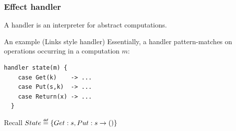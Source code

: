 \begin{frame}[fragile]
  \frametitle{Effect handler}
  \begin{definition}[Handler]
    A handler is an interpreter for abstract computations.
  \end{definition}
  \begin{block}{An example (Links style handler)}
    Essentially, a handler pattern-matches on operations occurring in a computation $m$:
    \begin{lstlisting}[style=spacey]
  handler state(m) {
    case Get(k)    -> ...
    case Put(s,k)  -> ...
    case Return(x) -> ...
  }
    \end{lstlisting}
Recall $State \defas \{ Get : s, Put : s \to () \}$
  \end{block}
\end{frame}






